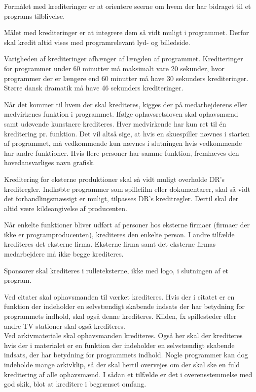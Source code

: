 \noindent
Formålet med krediteringer er at orientere seerne om hvem der har bidraget til et programs tilblivelse.

Målet med krediteringer er at integrere dem så vidt muligt i programmet. Derfor skal kredit altid vises med programrelevant lyd- og billedside.

Varigheden af krediteringer afhænger af længden af programmet. Krediteringer for programmer under 60 minutter må maksimalt vare 20 sekunder, hvor programmer der er længere end 60 minutter må have 30 sekunders krediteringer. Større dansk dramatik må have 46 sekunders krediteringer.

Når det kommer til hvem der skal krediteres, kigges der på medarbejderens eller medvirkenes funktion i programmet. Ifølge ophavsretsloven skal ophavsmænd samt udøvende kunstnere krediteres.
Hver medvirkende har kun ret til én kreditering pr. funktion. Det vil altså sige, at hvis en skuespiller nævnes i starten af programmet, må vedkommende kun nævnes i slutningen hvis vedkommende har andre funktioner.
Hvis flere personer har samme funktion, fremhæves den hovedansvarliges navn grafisk.

Kreditering for eksterne produktioner skal så vidt muligt overholde DR's kreditregler. Indkøbte programmer som spillefilm eller dokumentarer, skal så vidt det forhandlingsmæssigt er muligt, tilpasses DR's kreditregler. Dertil skal der altid være kildeangivelse af producenten.

Når enkelte funktioner bliver udført af personer hos eksterne firmaer (firmaer der ikke er programproducenten), krediteres den enkelte person. I andre tilfælde krediteres det eksterne firma. Eksterne firma samt det eksterne firmas medarbejdere må ikke begge krediteres.

Sponsorer skal krediteres i rulleteksterne, ikke med logo, i slutningen af et program.

Ved citater skal ophavsmanden til værket krediteres. Hvis der i citatet er en funktion der indeholder en selvstændigt skabende indsats der har betydning for programmets indhold, skal også denne krediteres. Kilden, fx spillesteder eller andre TV-stationer skal også krediteres. \\
Ved arkivmateriale skal ophavsmanden krediteres. Også her skal der krediteres hvis der i materialet er en funktion der indeholder en selvstændigt skabende indsats, der har betydning for programmets indhold. Nogle programmer kan dog indeholde mange arkivklip, så der skal hertil overvejes om der skal ske en fuld kreditering af alle ophavsmænd. I sådan et tilfælde er det i overensstemmelse med god skik, blot at kreditere i begrænset omfang.

